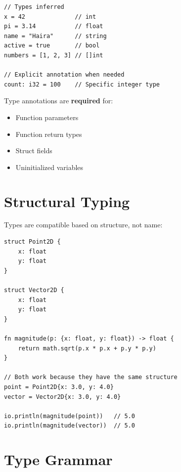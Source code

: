 \begin{lstlisting}
// Types inferred
x = 42              // int
pi = 3.14           // float
name = "Haira"      // string
active = true       // bool
numbers = [1, 2, 3] // []int

// Explicit annotation when needed
count: i32 = 100    // Specific integer type
\end{lstlisting}

\begin{warning}
Type annotations are \textbf{required} for:
\begin{itemize}
    \item Function parameters
    \item Function return types
    \item Struct fields
    \item Uninitialized variables
\end{itemize}
\end{warning}

\section{Structural Typing}

Types are compatible based on structure, not name:

\begin{lstlisting}
struct Point2D {
    x: float
    y: float
}

struct Vector2D {
    x: float
    y: float
}

fn magnitude(p: {x: float, y: float}) -> float {
    return math.sqrt(p.x * p.x + p.y * p.y)
}

// Both work because they have the same structure
point = Point2D{x: 3.0, y: 4.0}
vector = Vector2D{x: 3.0, y: 4.0}

io.println(magnitude(point))   // 5.0
io.println(magnitude(vector))  // 5.0
\end{lstlisting}

\section{Type Grammar}

